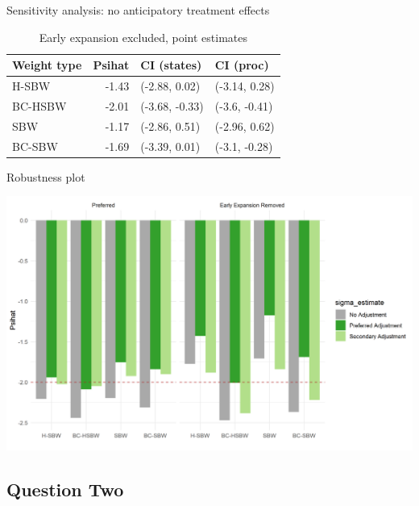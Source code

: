 \documentclass[hyperref={pdfpagelabels=false}]{beamer}
\begin{document}
\begin{frame}{Sensitivity analysis: no anticipatory treatment effects}
    \begin{table}[ht]
\centering
\begin{table}[ht]
\begin{tabular}{lrll}
  \toprule
Weight type & Psihat & CI (states) & CI (proc) \\ 
  \midrule
H-SBW & -1.43 & (-2.88, 0.02) & (-3.14, 0.28) \\ 
  BC-HSBW & -2.01 & (-3.68, -0.33) & (-3.6, -0.41) \\ 
  SBW & -1.17 & (-2.86, 0.51) & (-2.96, 0.62) \\ 
  BC-SBW & -1.69 & (-3.39, 0.01) & (-3.1, -0.28) \\ 
   \bottomrule
\end{tabular}
\end{table}
\caption{Early expansion excluded, point estimates}
\label{tab:confintmainc2}
\end{table}
\end{frame}

\begin{frame}{Robustness plot}

\begin{center}
	\includegraphics[scale=0.5]{01_Plots/all-estimates-c1c2.png}
\end{center}
\end{frame}

\subsection{Question Two}
\end{document}
